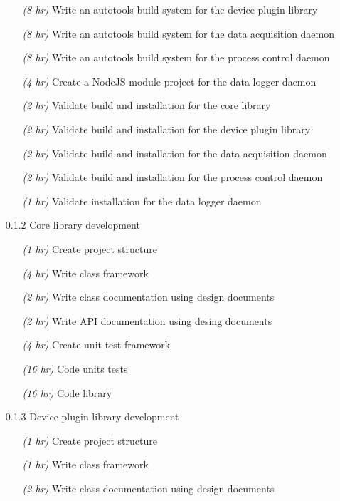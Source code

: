 \documentclass[11pt]{article}
\begin{document}
\begin{itemize}
\begin{itemize}
            \item[\emph{(8 hr)}] Write an autotools build system for the device plugin library
            \item[\emph{(8 hr)}] Write an autotools build system for the data acquisition daemon
            \item[\emph{(8 hr)}] Write an autotools build system for the process control daemon
            \item[\emph{(4 hr)}] Create a NodeJS module project for the data logger daemon
            \item[\emph{(2 hr)}] Validate build and installation for the core library
            \item[\emph{(2 hr)}] Validate build and installation for the device plugin library
            \item[\emph{(2 hr)}] Validate build and installation for the data acquisition daemon
            \item[\emph{(2 hr)}] Validate build and installation for the process control daemon
            \item[\emph{(1 hr)}] Validate installation for the data logger daemon
          \end{itemize}
        \item[0.1.2] Core library development
          \begin{itemize}
            \item[\emph{(1 hr)}] Create project structure
            \item[\emph{(4 hr)}] Write class framework
            \item[\emph{(2 hr)}] Write class documentation using design documents
            \item[\emph{(2 hr)}] Write API documentation using desing documents
            \item[\emph{(4 hr)}] Create unit test framework
            \item[\emph{(16 hr)}] Code units tests
            \item[\emph{(16 hr)}] Code library
          \end{itemize}
        \item[0.1.3] Device plugin library development
          \begin{itemize}
            \item[\emph{(1 hr)}] Create project structure
            \item[\emph{(1 hr)}] Write class framework
            \item[\emph{(2 hr)}] Write class documentation using design documents

\end{itemize}
\end{itemize}
\end{document}
